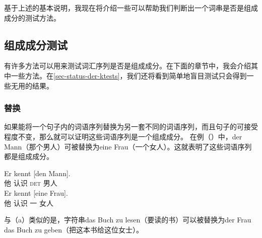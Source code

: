 基于上述的基本说明，我现在将介绍一些可以帮助我们判断出一个词串是否是组成成分的测试方法。


\subsection{组成成分测试}
有许多方法可以用来测试词汇序列是否是组成成分。在下面的章节中，我会介绍其中一些方法。在\ref{sec-status-der-ktests}，我们还将看到简单地盲目测试只会得到一些无用的结果。

\subsubsection{替换}
如果能将一个句子内的词语序列替换为另一套不同的词语序列，而且句子的可接受程度不变，那么就可以证明这些词语序列是一个组成成分。
在例（）中，der Mann（那个男人）可被替换为eine Frau（一个女人）。这就表明了这些词语序列都是组成成分。

\eal
\ex 
\gll Er kennt [den Mann].\\
     他 认识 \spacebr{}\textsc{det} 男人\\
\ex 
\gll Er kennt [eine Frau].\\
     他 认识 \spacebr{}一 女人\\
\zl

\noindent
与（a）类似的是，字符串das Buch zu lesen（要读的书）可以被替换为der Frau das Buch zu geben（把这本书给这位女士）。


